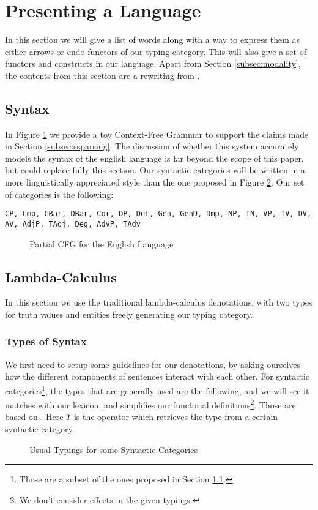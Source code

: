 \section{Presenting a Language}
\label{sec:language}
In this section we will give a list of words along with a way to express them
as either arrows or endo-functors of our typing category.
This will also give a set of functors and constructs in our language.
Apart from Section \ref{subsec:modality}, the contents from this section are a
rewriting from \cite{bumfordEffectdrivenInterpretationFunctors2025}.

\subsection{Syntax}
\label{subsec:syntax}
In Figure \ref{fig:english-cfg} we provide a toy Context-Free Grammar to
support the claims made in Section \ref{subsec:ssparsing}.
The discussion of whether this system accurately models the syntax of the
english language is far beyond the scope of this paper, but could replace
fully this section.
Our syntactic categories will be written in a more linguistically
appreciated style than the one proposed in Figure \ref{fig:sctypes}.
Our set of categories is the following:
\begin{center}
	\tt CP, Cmp, CBar, DBar, Cor, DP, Det, Gen, GenD, Dmp, NP, TN, VP, TV, DV, AV, AdjP, TAdj, Deg, AdvP, TAdv
\end{center}

\begin{figure}
	\centering
	\caption{Partial CFG for the English Language}\label{fig:english-cfg}
\end{figure}

\subsection{Lambda-Calculus}\label{subsec:lambdacalc}
In this section we use the traditional lambda-calculus denotations, with
two types for truth values and entities freely generating our typing category.

\subsubsection{Types of Syntax}\label{subsec:typingsyntax}
We first need to setup some guidelines for our denotations, by asking ourselves
how the different components of sentences interact with each other.
For syntactic categories\footnote{Those are a subset of the ones proposed
	in Section \ref{subsec:syntax}.}, the types that are generally used are the
following, and we will see it matches with our lexicon, and simplifies our
functorial definitions\footnote{We don't consider effects in the given typings.}.
Those are based on \cite{parteeLecture2Lambda}. Here $\Upsilon$ is the
operator which retrieves the type from a certain syntactic category.
\begin{figure}
	\centering
	\caption{Usual Typings for some Syntactic Categories}
	\label{fig:sctypes}
\end{figure}

